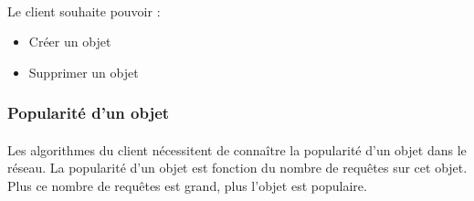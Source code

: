 \documentclass[12pt]{article}
\begin{document}
\paragraph{} Le client souhaite pouvoir :
\begin{itemize}
 \item Créer un objet
 \item Supprimer un objet
\end{itemize}

\subsubsection{Popularité d'un objet}

\paragraph{} Les algorithmes du client nécessitent de connaître la popularité d'un objet dans le réseau.
La popularité d'un objet est fonction du nombre de requêtes sur cet objet. Plus ce nombre de requêtes est grand, plus l'objet est populaire.






\end{document}
